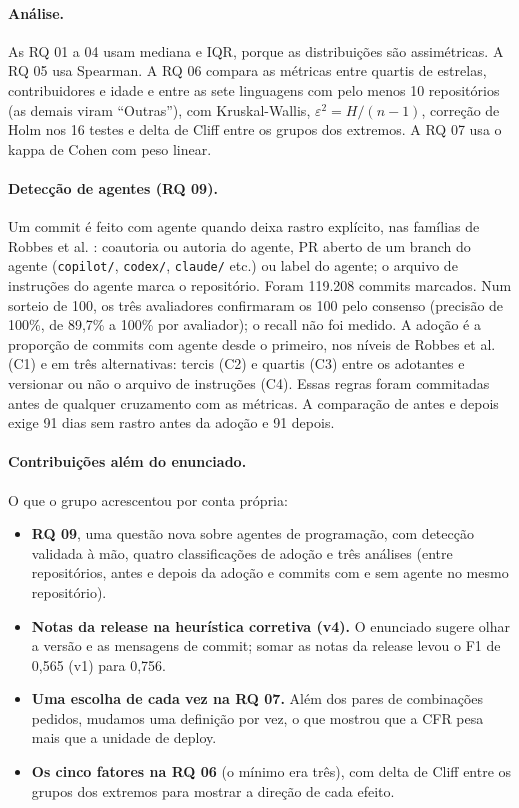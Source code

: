 \documentclass[12pt]{article}
\begin{document}
\paragraph{Análise.} As RQ 01 a 04 usam mediana e IQR, porque as distribuições são assimétricas.
A RQ 05 usa Spearman. A RQ 06 compara as métricas entre quartis de estrelas, contribuidores e idade
e entre as sete linguagens com pelo menos 10 repositórios (as demais viram ``Outras''), com
Kruskal-Wallis, $\varepsilon^2 = H/(n-1)$, correção de Holm nos 16 testes e delta de Cliff entre os
grupos dos extremos. A RQ 07 usa o kappa de Cohen com peso linear.

\paragraph{Detecção de agentes (RQ 09).} Um commit é feito com agente quando deixa rastro
explícito, nas famílias de Robbes et al. \cite{robbes2026agentic}: coautoria ou autoria do agente,
PR aberto de um branch do agente (\texttt{copilot/}, \texttt{codex/}, \texttt{claude/} etc.) ou label
do agente; o arquivo de instruções do agente marca o repositório. Foram 119.208 commits marcados. Num
sorteio de 100, os três avaliadores confirmaram os 100 pelo consenso (precisão de 100\%, de 89,7\% a
100\% por avaliador); o recall não foi medido. A adoção é a proporção de commits com agente desde o
primeiro, nos níveis de Robbes et al. (C1) e em três alternativas: tercis (C2) e quartis (C3) entre os
adotantes e versionar ou não o arquivo de instruções (C4). Essas regras foram commitadas antes de
qualquer cruzamento com as métricas. A comparação de antes e depois exige 91 dias sem rastro antes da
adoção e 91 depois.

\paragraph{Contribuições além do enunciado.} O que o grupo acrescentou por conta própria:
\begin{itemize}
\item \textbf{RQ 09}, uma questão nova sobre agentes de programação, com detecção validada à mão,
quatro classificações de adoção e três análises (entre repositórios, antes e depois da adoção e
commits com e sem agente no mesmo repositório).
\item \textbf{Notas da release na heurística corretiva (v4).} O enunciado sugere olhar a versão e as
mensagens de commit; somar as notas da release levou o F1 de 0,565 (v1) para 0,756.
\item \textbf{Uma escolha de cada vez na RQ 07.} Além dos pares de combinações pedidos, mudamos uma
definição por vez, o que mostrou que a CFR pesa mais que a unidade de deploy.
\item \textbf{Os cinco fatores na RQ 06} (o mínimo era três), com delta de Cliff entre os grupos dos
extremos para mostrar a direção de cada efeito.
\end{itemize}
\end{document}

